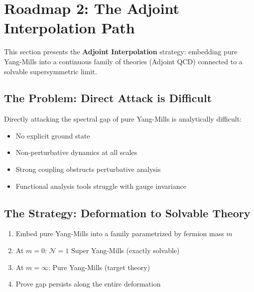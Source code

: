 \section{Roadmap 2: The Adjoint Interpolation Path}
\label{sec:roadmap-adjoint-interpolation}
\label{subsec:adjoint-interpolation}

This section presents the \textbf{Adjoint Interpolation} strategy: embedding 
pure Yang-Mills into a continuous family of theories (Adjoint QCD) connected 
to a solvable supersymmetric limit.

\subsection{The Problem: Direct Attack is Difficult}

\begin{problem}
Directly attacking the spectral gap of pure Yang-Mills is analytically difficult:
\begin{itemize}
\item No explicit ground state
\item Non-perturbative dynamics at all scales
\item Strong coupling obstructs perturbative analysis
\item Functional analysis tools struggle with gauge invariance
\end{itemize}
\end{problem}

\subsection{The Strategy: Deformation to Solvable Theory}

\begin{strategy}
\begin{enumerate}
\item Embed pure Yang-Mills into a family parametrized by fermion mass $m$
\item At $m = 0$: $\mathcal{N}=1$ Super Yang-Mills (exactly solvable)
\item At $m = \infty$: Pure Yang-Mills (target theory)
\item Prove gap persists along the entire deformation
\end{enumerate}
\end{strategy}

